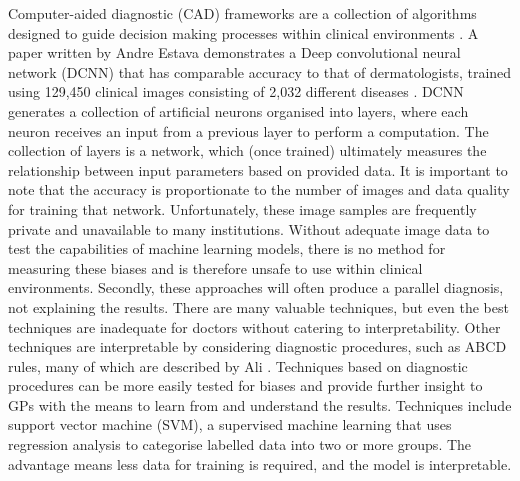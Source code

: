 \documentclass[10.5pt]{report}
\begin{document}
Computer-aided diagnostic (CAD) frameworks are a collection of algorithms designed to guide decision making processes within clinical environments \cite{Dick2019}. A paper written by Andre Estava demonstrates a Deep convolutional neural network (DCNN) that has comparable accuracy to that of dermatologists, trained using 129,450 clinical images consisting of 2,032 different diseases \cite{Andre2017}. DCNN generates a collection of artificial neurons organised into layers, where each neuron receives an input from a previous layer to perform a computation. The collection of layers is a network, which (once trained) ultimately measures the relationship between input parameters based on provided data. It is important to note that the accuracy is proportionate to the number of images and data quality for training that network. Unfortunately, these image samples are frequently private and unavailable to many institutions. Without adequate image data to test the capabilities of machine learning models, there is no method for measuring these biases and is therefore unsafe to use within clinical environments. Secondly, these approaches will often produce a parallel diagnosis, not explaining the results. There are many valuable techniques, but even the best techniques are inadequate for doctors without catering to interpretability. Other techniques are interpretable by considering diagnostic procedures, such as ABCD rules, many of which are described by Ali \cite{Ali2020}. Techniques based on diagnostic procedures can be more easily tested for biases and provide further insight to GPs with the means to learn from and understand the results. Techniques include support vector machine (SVM), a supervised machine learning that uses regression analysis to categorise labelled data into two or more groups. The advantage means less data for training is required, and the model is interpretable.
\end{document}
